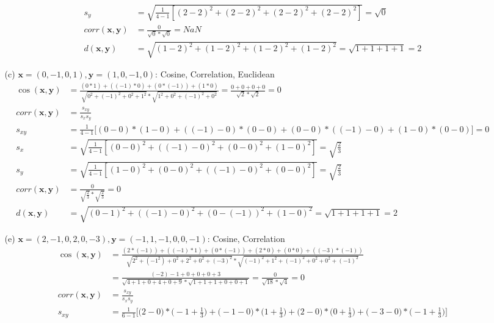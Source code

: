 \documentclass{article}
\begin{document}
\begin{itemize}
\begin{itemize}
\begin{align}
            s_y&=\sqrt{\frac{1}{4-1}[(2-2)^2+(2-2)^2+(2-2)^2+(2-2)^2]}=\sqrt{0}\nonumber\\
            corr(\textbf{x},\textbf{y})&=\frac{0}{\sqrt{0}*\sqrt{0}}=NaN\nonumber\\
            d(\textbf{x},\textbf{y})&=\sqrt{(1-2)^2+(1-2)^2+(1-2)^2+(1-2)^2}=\sqrt{1+1+1+1}=2\nonumber
        \end{align}
        \item[(c)] $\textbf{x}=(0,-1,0,1), \textbf{y}=(1,0,-1,0)$: Cosine, Correlation, Euclidean
        \begin{align}
            \cos(\textbf{x},\textbf{y})&=\frac{(0*1)+((-1)*0)+(0*(-1))+(1*0)}{\sqrt{0^2+(-1)^2+0^2+1^2}*\sqrt{1^2+0^2+(-1)^2+0^2}}=\frac{0+0+0+0}{\sqrt{2}*\sqrt{2}} = 0\nonumber\\
            corr(\textbf{x},\textbf{y})&=\frac{s_{xy}}{s_xs_y}\nonumber\\
            s_{xy}&=\frac{1}{4-1}\Big[(0-0)*(1-0)+((-1)-0)*(0-0)+(0-0)*((-1)-0)+(1-0)*(0-0)\Big]=0\nonumber\\
            s_x&=\sqrt{\frac{1}{4-1} [(0-0)^2+((-1)-0)^2+(0-0)^2+(1-0)^2]}=\sqrt{\frac{2}{3}}\nonumber\\
            s_y&=\sqrt{\frac{1}{4-1}[(1-0)^2+(0-0)^2+((-1)-0)^2+(0-0)^2]}=\sqrt{\frac{2}{3}}\nonumber\\
            corr(\textbf{x},\textbf{y})&=\frac{0}{\sqrt{\frac{2}{3}}*\sqrt{\frac{2}{3}}}=0\nonumber\\
            d(\textbf{x},\textbf{y})&=\sqrt{(0-1)^2+((-1)-0)^2+(0-(-1))^2+(1-0)^2}=\sqrt{1+1+1+1}=2\nonumber
        \end{align}
        \item[(e)] $\textbf{x}=(2,-1,0,2,0,-3), \textbf{y}=(-1,1,-1,0,0,-1)$: Cosine, Correlation
        \begin{align}
            \cos(\textbf{x},\textbf{y})&=\frac{(2*(-1))+((-1)*1)+(0*(-1))+(2*0)+(0*0)+((-3)*(-1))}{\sqrt{2^2+(-1^2)+0^2+2^2+0^2+(-3)^2}*\sqrt{(-1)^2+1^2+(-1)^2+0^2+0^2+(-1)^2}}\nonumber\\
            &=\frac{(-2)-1+0+0+0+3}{\sqrt{4+1+0+4+0+9}*\sqrt{1+1+1+0+0+1}}=\frac{0}{\sqrt{18}*\sqrt{4}}=0\nonumber\\
            corr(\textbf{x},\textbf{y})&=\frac{s_{xy}}{s_xs_y}\nonumber\\
            s_{xy}&=\frac{1}{6-1}\Bigg[\Big(2-0\Big)*\Big(-1+\frac{1}{3}\Big)+\Big(-1-0\Big)*\Big(1+\frac{1}{3}\Big)+\Big(2-0\Big)*\Big(0+\frac{1}{3}\Big)+\Big(-3-0\Big)*\Big(-1+\frac{1}{3}\Big)\Bigg]\nonumber\\

\end{align}
\end{itemize}
\end{itemize}
\end{document}
